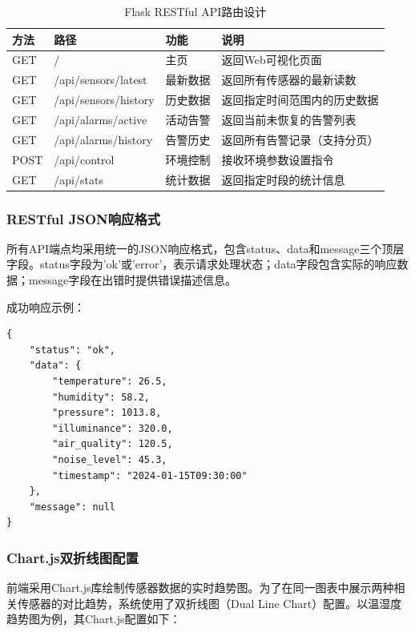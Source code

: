 \documentclass[12pt,a4paper]{ctexart}
\begin{document}
\begin{table}[H]
    \centering
    \caption{Flask RESTful API路由设计}
    \label{tab:api}
    \begin{tabular}{@{}lllp{5.5cm}@{}}
        \toprule
        \textbf{方法} & \textbf{路径} & \textbf{功能} & \textbf{说明} \\
        \midrule
        GET & / & 主页 & 返回Web可视化页面 \\
        GET & /api/sensors/latest & 最新数据 & 返回所有传感器的最新读数 \\
        GET & /api/sensors/history & 历史数据 & 返回指定时间范围内的历史数据 \\
        GET & /api/alarms/active & 活动告警 & 返回当前未恢复的告警列表 \\
        GET & /api/alarms/history & 告警历史 & 返回所有告警记录（支持分页） \\
        POST & /api/control & 环境控制 & 接收环境参数设置指令 \\
        GET & /api/stats & 统计数据 & 返回指定时段的统计信息 \\
        \bottomrule
    \end{tabular}
\end{table}

\subsubsection{RESTful JSON响应格式}

所有API端点均采用统一的JSON响应格式，包含status、data和message三个顶层字段。status字段为'ok'或'error'，表示请求处理状态；data字段包含实际的响应数据；message字段在出错时提供错误描述信息。

成功响应示例：
\begin{lstlisting}[caption={API成功响应示例},label={lst:api_ok}]
{
    "status": "ok",
    "data": {
        "temperature": 26.5,
        "humidity": 58.2,
        "pressure": 1013.8,
        "illuminance": 320.0,
        "air_quality": 120.5,
        "noise_level": 45.3,
        "timestamp": "2024-01-15T09:30:00"
    },
    "message": null
}
\end{lstlisting}

\subsubsection{Chart.js双折线图配置}

前端采用Chart.js库绘制传感器数据的实时趋势图。为了在同一图表中展示两种相关传感器的对比趋势，系统使用了双折线图（Dual Line Chart）配置。以温湿度趋势图为例，其Chart.js配置如下：
\end{document}
